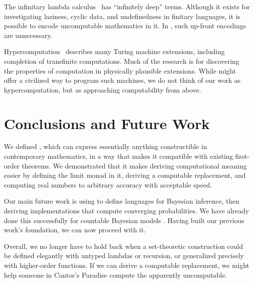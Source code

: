 The infinitary lambda calculus~\cite{cit:kennaway-1996-inf-lc} has ``infinitely deep'' terms. Although it exists for investigating laziness, cyclic data, and undefinedness in finitary languages, it is possible to encode uncomputable mathematics in it. In \targetlang, such up-front encodings are unnecessary.

Hypercomputation~\cite{cit:ord-2006-hypercomp} describes many Turing machine extensions, including completion of transfinite computations. Much of the research is for discovering the properties of computation in physically plausible extensions. While \targetlang might offer a civilized way to program such machines, we do not think of our work as hypercomputation, but as approaching computability from above.


\section{Conclusions and Future Work}

We defined \targetlang, which can express essentially anything constructible in contemporary mathematics, in a way that makes it compatible with existing first-order theorems. We demonstrated that it makes deriving computational meaning easier by defining the limit monad in it, deriving a computable replacement, and computing real numbers to arbitrary accuracy with acceptable speed.

Our main future work is using \targetlang to define languages for Bayesian inference, then deriving implementations that compute converging probabilities. We have already done this successfully for countable Bayesian models \cite{cit:toronto-2010ifl-bayes}. Having built our previous work's foundation, we can now proceed with it.

Overall, we no longer have to hold back when a set-theoretic construction could be defined elegantly with untyped lambdas or recursion, or generalized precisely with higher-order functions. If we can derive a computable replacement, we might help someone in Cantor's Paradise compute the apparently uncomputable.

